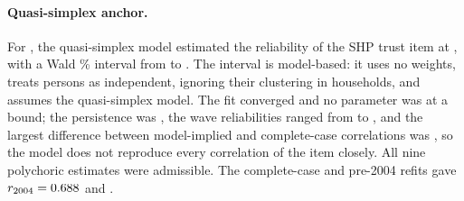 \paragraph{Quasi-simplex anchor.}
For , the quasi-simplex model estimated the reliability of the SHP trust item at , with a Wald \% interval from  to . The interval is model-based: it uses no weights, treats persons as independent, ignoring their clustering in households, and assumes the quasi-simplex model. The fit converged and no parameter was at a bound; the persistence was , the wave reliabilities ranged from  to , and the largest difference between model-implied and complete-case correlations was , so the model does not reproduce every correlation of the item closely. All nine polychoric estimates were admissible. The complete-case and pre-2004 refits gave $r_{2004}=\resultnum{j.shp.complete_case.r2004}{0.688}$ and .

